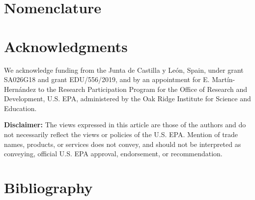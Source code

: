 \begin{refsection}[referencesCh3]
\section*{Nomenclature}

\vspace{-0.8cm}
\begingroup     
\let\clearpage\relax
%

%
\glsaddall
\setlength\LTleft{0pt}
\setlength\LTright{0pt}
\setlength\glsdescwidth{0.8\hsize}
\renewcommand*{\glossarypreamble}{\vspace{-0.8cm}}
\printglossary[type=VarCh3, style=long]
\vspace{10pt}
\printglossary[type=AcroCh3, style=long]
\endgroup


\section*{Acknowledgments} \label{section:Ch3Acknowledgments}
We acknowledge funding from the Junta de Castilla y Le\'{o}n, Spain, under grant SA026G18 and grant EDU/556/2019, and by an appointment for E. Mart\'{i}n-Hern\'{a}ndez to the Research Participation Program for the Office of Research and Development, U.S. EPA, administered by the Oak Ridge Institute for Science and Education. 

\textbf{Disclaimer:} The views expressed in this article are those of the authors and do not necessarily reflect the views or policies of the U.S. EPA. Mention of trade names, products, or services does not convey, and should not be interpreted as conveying, official U.S. EPA approval, endorsement, or recommendation.

\section*{Bibliography}

\printbibliography[heading=none]
\end{refsection}